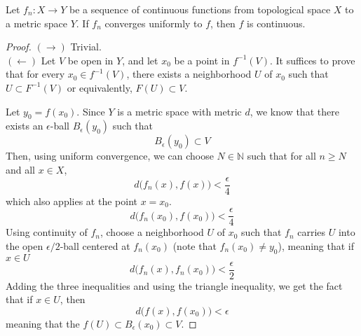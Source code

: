   \begin{theorem}
    Let $f_n: X \longrightarrow Y$ be a sequence of continuous functions from topological space $X$ to a metric space $Y$. If $f_n$ converges uniformly to $f$, then $f$ is continuous. 
  \end{theorem}
  \begin{proof}
    $(\rightarrow)$ Trivial. \\
    $(\leftarrow)$ Let $V$ be open in $Y$, and let $x_0$ be a point in $f^{-1} (V)$. It suffices to prove that for every $x_0 \in f^{-1} (V)$, there exists a neighborhood $U$ of $x_0$ such that $U \subset F^{-1} (V)$ or equivalently, $F(U) \subset V$. 

    Let $y_0 = f(x_0)$. Since $Y$ is a metric space with metric $d$, we know that there exists an $\epsilon$-ball $B_\epsilon (y_0)$ such that
    \begin{equation}
      B_\epsilon (y_0) \subset V
    \end{equation}
    Then, using uniform convergence, we can choose $N \in \mathbb{N}$ such that for all $n \geq N$ and all $x \in X$, 
    \begin{equation}
      d \big( f_n (x), f(x) \big) < \frac{\epsilon}{4}
    \end{equation}
    which also applies at the point $x = x_0$. 
    \begin{equation}
      d \big( f_n (x_0), f(x_0) \big) < \frac{\epsilon}{4}
    \end{equation}
    Using continuity of $f_n$, choose a neighborhood $U$ of $x_0$ such that $f_n$ carries $U$ into the open $\epsilon/2$-ball centered at $f_n (x_0)$ (note that $f_n (x_0) \neq y_0$), meaning that if $x \in U$
    \begin{equation}
      d \big( f_n (x), f_n (x_0) \big) < \frac{\epsilon}{2}
    \end{equation}
    Adding the three inequalities and using the triangle inequality, we get the fact that if $x \in U$, then 
    \begin{equation}
      d \big( f(x), f(x_0) \big) < \epsilon
    \end{equation}
    meaning that the $f(U) \subset B_\epsilon (x_0) \subset V$. 


\end{proof}
